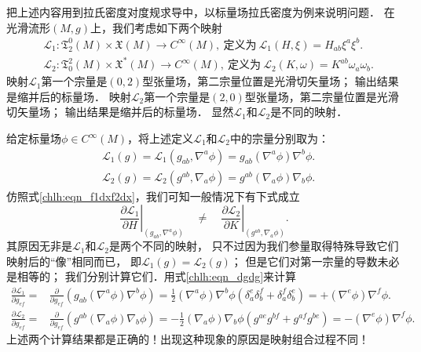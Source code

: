 把上述内容用到拉氏密度对度规求导中，以标量场拉氏密度为例来说明问题．
在光滑流形$(M,g)$上，我们考虑如下两个映射
\begin{align}
    &\mathscr{L}_1: \mathfrak{T}^0_2(M)\times \mathfrak{X}(M)
    \to C^{\infty}(M), \ \text{定义为}\ \mathscr{L}_1(H,\xi)= H_{ab}\xi^a\xi^b. \\
    &\mathscr{L}_2: \mathfrak{T}^2_0(M)\times \mathfrak{X}^*(M)
    \to C^{\infty}(M), \  \text{定义为}\  \mathscr{L}_2(K,\omega)= K^{ab}\omega_a\omega_b.
\end{align} %
映射$\mathscr{L}_1$第一个宗量是$(0,2)$型张量场，第二宗量位置是光滑切矢量场；
输出结果是缩并后的标量场．
映射$\mathscr{L}_2$第一个宗量是$(2,0)$型张量场，第二宗量位置是光滑切矢量场；
输出结果是缩并后的标量场．
显然$\mathscr{L}_1$和$\mathscr{L}_2$是不同的映射．

给定标量场$\phi\in C^\infty(M)$，将上述定义$\mathscr{L}_1$和$\mathscr{L}_2$中的宗量分别取为：
\begin{align}
    &\mathscr{L}_1(g)= \mathscr{L}_1(g_{ab},\nabla^a \phi)= g_{ab}(\nabla^a\phi) \nabla^b\phi . \\
    &\mathscr{L}_2(g)= \mathscr{L}_2(g^{ab},\nabla_a \phi)= g^{ab}(\nabla_a\phi) \nabla_b\phi .
\end{align}
仿照式\eqref{chlh:eqn_f1dxf2dx}，我们可知一般情况下有下式成立
\begin{equation}\label{chlh:eqn_dLdg}
    \left.\frac{\partial \mathscr{L}_1}{\partial H}\right|_{(g_{ab},\nabla^a \phi)}
    \quad \neq \quad
    \left.\frac{\partial \mathscr{L}_2}{\partial K}\right|_{(g^{ab},\nabla_a \phi)} .
\end{equation}
其原因无非是$\mathscr{L}_1$和$\mathscr{L}_2$是两个不同的映射，
只不过因为我们参量取得特殊导致它们映射后的“像”相同而已，
即$\mathscr{L}_1(g)=\mathscr{L}_2(g)$；
但是它们对第一宗量的导数未必是相等的；
我们分别计算它们．用式\eqref{chlh:eqn_dgdg}来计算
\begin{align*}
    \frac{\partial \mathscr{L}_{1}}{\partial g_{ef}} =&
    \frac{\partial }{\partial g_{ef}}\left(g_{ab}(\nabla^a\phi)\nabla^b\phi \right)
    =\frac{1}{2} (\nabla^a\phi)\nabla^b\phi
    \left( \delta_a^e \delta_b^f +\delta_a^f \delta_b^e  \right)
    = +(\nabla^e\phi)\nabla^f\phi . \\
    \frac{\partial \mathscr{L}_{2}}{\partial g_{ef}} =&
    \frac{\partial }{\partial g_{ef}}\left(g^{ab}(\nabla_a\phi)\nabla_b\phi \right)
    =-\frac{1}{2} (\nabla_a\phi)\nabla_b\phi
    ( g^{ae}g^{bf} +g^{af}g^{be} )
    = -(\nabla^e\phi)\nabla^f\phi .
\end{align*} %
上述两个计算结果都是正确的！出现这种现象的原因是映射组合过程不同！

